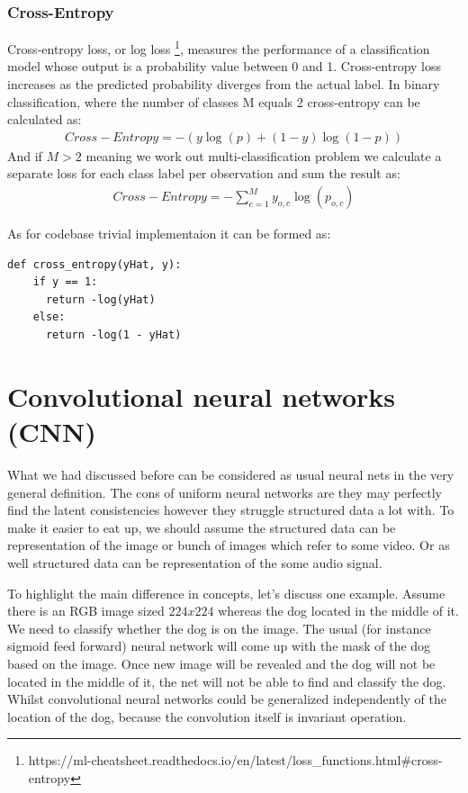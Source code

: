 \subsubsection{Cross-Entropy}
Cross-entropy loss, or log loss \footnote{https://ml-cheatsheet.readthedocs.io/en/latest/loss_functions.html#cross-entropy}, measures the performance of a classification model whose output is a probability value between 0 and 1. Cross-entropy loss increases as the predicted probability diverges from the actual label.
In binary classification, where the number of classes M equals 2 cross-entropy can be calculated as:
\begin{align*}
Cross-Entropy = -{(y\log(p) + (1 - y)\log(1 - p))}
\end{align*}
And if $M > 2$ meaning we work out multi-classification problem we calculate a separate loss for each class label per observation and sum the result as:
\begin{align*}
Cross-Entropy = -\sum_{c=1}^My_{o,c}\log(p_{o,c})
\end{align*}

As for codebase trivial implementaion it can be formed as:  
\begin{lstlisting}
def cross_entropy(yHat, y):
    if y == 1:
      return -log(yHat)
    else:
      return -log(1 - yHat)
\end{lstlisting}


\section{Convolutional neural networks (CNN)}
What we had discussed before can be considered as usual neural nets in the very general definition. The cons of uniform neural networks are they may perfectly find the latent consistencies however they struggle structured data a lot with. To make it easier to eat up, we should assume the structured data can be representation of the image or bunch of images which refer to some video. Or as well structured data can be representation of the some audio signal.

To highlight the main difference in concepts, let's discuss one example.
Assume there is an RGB image sized $224x224$ whereas the dog located in the middle of it. We need to classify whether the dog is on the image. The usual (for instance sigmoid feed forward) neural network will come up with the mask of the dog based on the image. Once new image will be revealed and the dog will not be located in the middle of it, the net will not be able to find and classify the dog. Whilst convolutional neural networks could be generalized independently of the location of the dog, because the convolution itself is invariant operation.         


